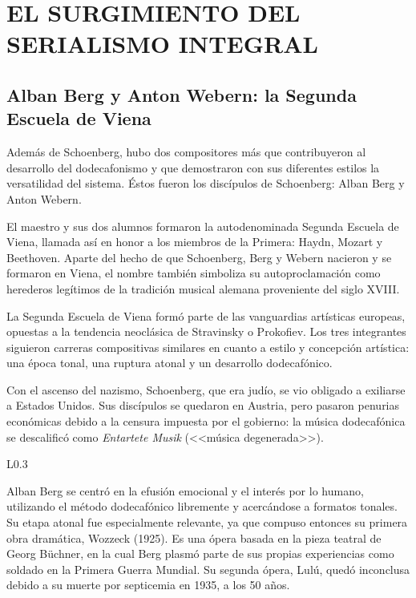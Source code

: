 \chapter{EL SURGIMIENTO DEL SERIALISMO INTEGRAL}
	\section{Alban Berg y Anton Webern: la Segunda Escuela de Viena}
	\label{berweb}
	Además de Schoenberg, hubo dos compositores más que contribuyeron al desarrollo del dodecafonismo y que demostraron con sus diferentes estilos la versatilidad del sistema. Éstos fueron los discípulos de Schoenberg: Alban Berg y Anton Webern. 
	
	El maestro y sus dos alumnos formaron la autodenominada Segunda Escuela de Viena, llamada así en honor a los miembros de la Primera: Haydn, Mozart y Beethoven. Aparte del hecho de que Schoenberg, Berg y Webern nacieron y se formaron en Viena, el nombre también simboliza su autoproclamación como herederos legítimos de la tradición musical alemana proveniente del siglo XVIII.
	
	La Segunda Escuela de Viena formó parte de las vanguardias artísticas europeas, opuestas a la tendencia neoclásica de Stravinsky o Prokofiev. Los tres integrantes siguieron carreras compositivas similares en cuanto a estilo y concepción artística: una época tonal, una ruptura atonal y un desarrollo dodecafónico.
	
	Con el ascenso del nazismo, Schoenberg, que era judío, se vio obligado a exiliarse a Estados Unidos. Sus discípulos se quedaron en Austria, pero pasaron penurias económicas debido a la censura impuesta por el gobierno: la música dodecafónica se descalificó como \emph{Entartete Musik} (<<música degenerada>>).
	
	\begin{wrapfigure}{L}{0.3\textwidth}
		\captionsetup{justification=centering, font=footnotesize}
		\vspace{-\bigskipamount}
	\end{wrapfigure}
	Alban Berg se centró en la efusión emocional y el interés por lo humano, utilizando el método dodecafónico libremente y acercándose a formatos tonales. Su etapa atonal fue especialmente relevante, ya que compuso entonces su primera obra dramática, Wozzeck (1925). Es una ópera basada en la pieza teatral de Georg Büchner, en la cual Berg plasmó parte de sus propias experiencias como soldado en la Primera Guerra Mundial. Su segunda ópera, Lulú, quedó inconclusa debido a su muerte por septicemia en 1935, a los 50 años.
	
